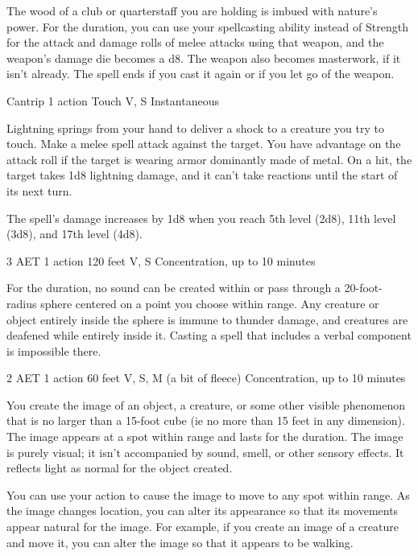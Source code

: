 The wood of a club or quarterstaff you are holding is imbued with nature's power. For the duration, you can use your spellcasting ability instead of Strength for the attack and damage rolls of melee attacks using that weapon, and the weapon's damage die becomes a d8. The weapon also becomes masterwork, if it isn't already. The spell ends if you cast it again or if you let go of the weapon.


{Cantrip}
{1 action}
{Touch}
{V, S}
{Instantaneous}

Lightning springs from your hand to deliver a shock to a creature you try to touch. Make a melee spell attack against the target. You have advantage on the attack roll if the target is wearing armor dominantly made of metal. On a hit, the target takes 1d8 lightning damage, and it can't take reactions until the start of its next turn.

The spell's damage increases by 1d8 when you reach 5th level (2d8), 11th level (3d8), and 17th level (4d8).


{3 AET}
{1 action}
{120 feet}
{V, S}
{Concentration, up to 10 minutes}

For the duration, no sound can be created within or pass through a 20-foot-radius sphere centered on a point you choose within range. Any creature or object entirely inside the sphere is immune to thunder damage, and creatures are deafened while entirely inside it. Casting a spell that includes a verbal component is impossible there.


{2 AET}
{1 action}
{60 feet}
{V, S, M (a bit of fleece)}
{Concentration, up to 10 minutes}

You create the image of an object, a creature, or some other visible phenomenon that is no larger than a 15-foot cube (ie no more than 15 feet in any dimension). The image appears at a spot within range and lasts for the duration. The image is purely visual; it isn't accompanied by sound, smell, or other sensory effects. It reflects light as normal for the object created.

You can use your action to cause the image to move to any spot within range. As the image changes location, you can alter its appearance so that its movements appear natural for the image. For example, if you create an image of a creature and move it, you can alter the image so that it appears to be walking.

